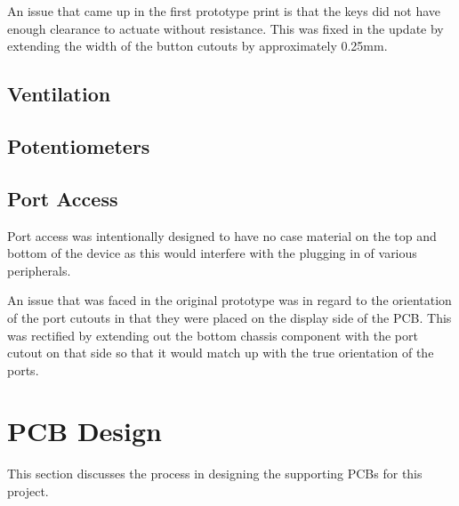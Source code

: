 An issue that came up in the first prototype print is that the keys did not have enough clearance to actuate without resistance.
This was fixed in the update by extending the width of the button cutouts by approximately 0.25mm. %


\subsection{Ventilation}


\subsection{Potentiometers}


\subsection{Port Access}

Port access was intentionally designed to have no case material on the top and bottom of the device as this would interfere with the plugging in of various peripherals.

An issue that was faced in the original prototype was in regard to the orientation of the port cutouts in that they were placed on the display side of the PCB.
This was rectified by extending out the bottom chassis component with the port cutout on that side so that it would match up with the true orientation of the ports. %


\section{PCB Design}
This section discusses the process in designing the supporting PCBs for this project.

